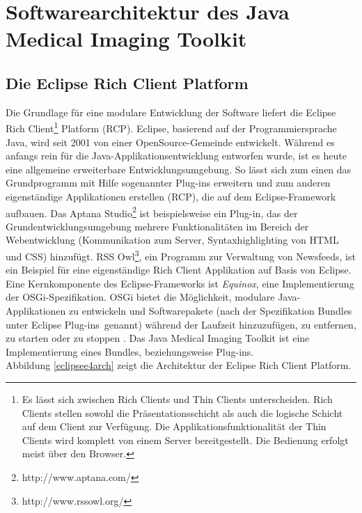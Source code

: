 \chapter{Softwarearchitektur des Java Medical Imaging Toolkit} \label{architecture}

\FloatBarrier
\section{Die Eclipse Rich Client Platform}

Die Grundlage für eine modulare Entwicklung der Software liefert die Eclipse Rich Client\footnote{Es lässt sich zwischen Rich Clients und Thin Clients unterscheiden. Rich Clients stellen sowohl die Präsentationsschicht als auch die logische Schicht auf dem Client zur Verfügung. Die Applikationsfunktionalität der Thin Clients wird komplett von einem Server bereitgestellt. Die Bedienung erfolgt meist über den Browser.} Platform (RCP). Eclipse, basierend auf der Programmiersprache Java, wird seit 2001 von einer OpenSource-Gemeinde entwickelt\cite{vogel:eclipseoverview}. Während es anfangs rein für die Java-Applikationsentwicklung entworfen wurde, ist es heute eine allgemeine erweiterbare Entwicklungsumgebung. So lässt sich zum einen das Grundprogramm mit Hilfe sogenannter Plug-ins erweitern und zum anderen eigenständige Applikationen erstellen (RCP), die auf dem Eclipse-Framework aufbauen. Das \glqq Aptana Studio\grqq\footnote{http://www.aptana.com/} ist beispielsweise ein Plug-in, das der Grundentwicklungsumgebung mehrere Funktionalitäten im Bereich der Webentwicklung (Kommunikation zum Server, Syntaxhighlighting von HTML und CSS) hinzufügt. \glqq RSS Owl\grqq\footnote{http://www.rssowl.org/}, ein Programm zur Verwaltung von Newsfeeds, ist ein Beispiel für eine eigenständige Rich Client Applikation auf Basis von Eclipse.\\
Eine Kernkomponente des Eclipse-Frameworks ist \textit{Equinox}, eine Implementierung der OSGi-Spezifikation. OSGi bietet die Möglichkeit, modulare Java-Applikationen zu entwickeln und Softwarepakete (nach der Spezifikation \glqq Bundles\grqq\, unter Eclipse \glqq Plug-ins\grqq\ genannt) während der Laufzeit hinzuzufügen, zu entfernen, zu starten oder zu stoppen \cite{vogel:e4overview}. Das Java Medical Imaging Toolkit ist eine Implementierung eines Bundles, beziehungsweise Plug-ins.\\
Abbildung \ref{eclipsee4arch} zeigt die Architektur der Eclipse Rich Client Platform.

